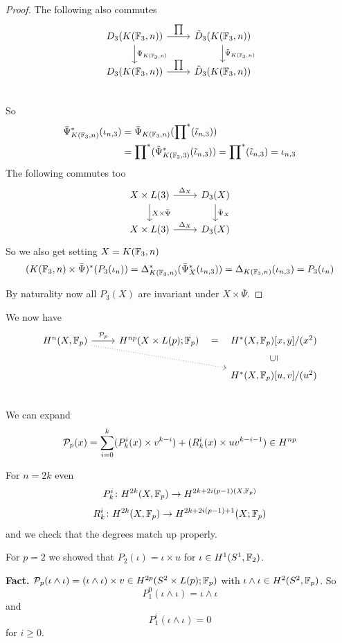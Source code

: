 \documentclass[language=english]{TemplateLecture}
\begin{document}
\begin{proof}
    The following also commutes
    \[\begin{tikzcd}
        D_3(K(\IF_3,n)) \ar[r, "\prod\nolimits"]\ar[d, "\bar\Psi_{K(\IF_3,n)}"] & \tilde D_3(K(\IF_3, n)) \ar[d, "\tilde \Psi_{K(\IF_3, n)}"] \\
        D_3 (K(\IF_3,n)) \ar[r, "\prod\nolimits"] & \tilde D_3(K(\IF_3,n)) \\
    \end{tikzcd}\]
    So
    \[\begin{split}
        \bar\Psi_{K(\mathbb{F}_3,n)}^*(\iota_{n,3}) &= \bar\Psi_{K(\mathbb{F}_3,n)}(\prod\nolimits^*(\tilde\iota_{n,3})) \\
        &= \prod\nolimits^*(\tilde \Psi_{K(\mathbb{F}_3,3)}^*(\tilde\iota_{n,3})) = \prod\nolimits^*(\tilde\iota_{n,3}) = \iota_{n,3}
    \end{split}\]
    The following commutes too
    \[\begin{tikzcd}
        X\times L(3) \ar[r, "\Delta_X"] \ar[d, "X\times \bar\Psi"] & D_3(X)\ar[d, "\bar\Psi_X"] \\
        X\times L(3) \ar[r, "\Delta_X"] & D_3(X)
    \end{tikzcd}\]
    So we also get setting \(X = K(\mathbb{F}_3,n)\)
    \[(K(\mathbb{F}_3,n) \times \bar\Psi)^*(P_3(\iota_n)) = \Delta^*_{K(\mathbb{F}_3,n)}(\bar\Psi_X^*(\iota_{n,3})) = \Delta_{K(\mathbb{F}_3,n)}(\iota_{n,3}) = P_3(\iota_n)\]

    By naturality now all \(P_3(X)\) are invariant under \(X\times \bar\Psi\).
\end{proof}

We now have
\[\begin{tikzcd}
    H^n(X,\IF_p)\ar[rrd, dotted] \ar[r, "\cP_p"] & H^{np}(X\times L(p); \IF_p) \ar[phantom, r, "="] & H^*(X,\IF_p)[x,y]/(x^2) \\
    & & H^*(X,\IF_p)[u,v]/(u^2) \ar[u, phantom, sloped, "\subseteq"] \\
\end{tikzcd}\]
We can expand
\[\mathcal{P}_p(x) = \sum_{i = 0}^k (P^i_k(x) \times v^{k-i}) +  (R_k^i(x) \times uv^{k-i-1}) \in H^{np}\]

For \(n = 2k\) even
\[P_k^i\colon H^{2k}(X,\mathbb{F}_p)\to H^{2k+2i(p-1)(X, \mathbb{F}_p)}\]
\[R_k^i\colon H^{2k}(X, \mathbb{F}_p) \to H^{2k+2i(p-1)+1}(X;\mathbb{F}_p)\]
and we check that the degrees match up properly.

For \(p=2\) we showed that \(P_2(\iota) = \iota\times u\) for \(\iota\in H^1(S^1, \mathbb{F}_2)\).

\textbf{Fact.} \(\mathcal{P}_p(\iota\wedge \iota) = (\iota\wedge \iota)\times v \in H^{2p}(S^2\times L(p); \mathbb{F}_p)\) with \(\iota\wedge \iota \in H^2(S^2, \mathbb{F}_p)\). So
\[P_1^0(\iota\wedge \iota) = \iota\wedge \iota\]
and
\[P_1^i(\iota\wedge \iota) = 0\]
for \(i\geq 0\).
\end{document}
